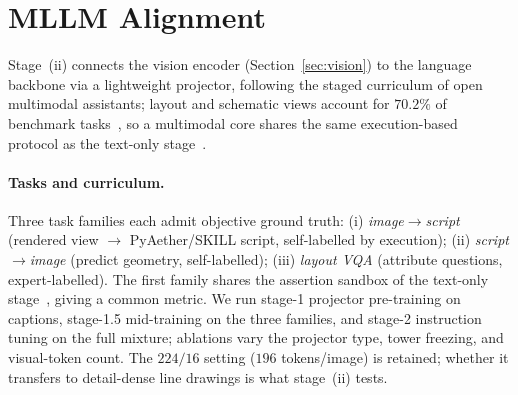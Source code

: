 ﻿\section{MLLM Alignment}\label{sec:mllm}

Stage~(ii) connects the vision encoder (Section~\ref{sec:vision}) to the language backbone via a lightweight projector, following the staged curriculum of open multimodal assistants; layout and schematic views account for $70.2\%$ of benchmark tasks~\cite{liu2026zhulong}, so a multimodal core shares the same execution-based protocol as the text-only stage~\cite{baiZe-llm}.

\paragraph{Tasks and curriculum.}
Three task families each admit objective ground truth: (i) \emph{image$\to$script} (rendered view $\to$ PyAether/SKILL script, self-labelled by execution); (ii) \emph{script$\to$image} (predict geometry, self-labelled); (iii) \emph{layout VQA} (attribute questions, expert-labelled).
The first family shares the assertion sandbox of the text-only stage~\cite{baiZe-llm}, giving a common metric.
We run stage-1 projector pre-training on captions, stage-1.5 mid-training on the three families, and stage-2 instruction tuning on the full mixture; ablations vary the projector type, tower freezing, and visual-token count.
The $224/16$ setting ($196$ tokens/image) is retained; whether it transfers to detail-dense line drawings is what stage~(ii) tests.

